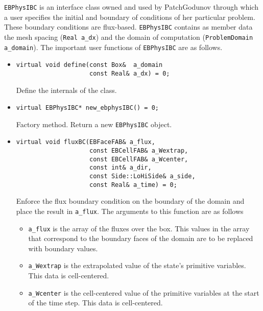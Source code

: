 {\tt EBPhysIBC} is an interface class owned and used by PatchGodunov
through which a user specifies the initial and boundary of conditions
of her particular problem.  These boundary conditions are 
flux-based.  {\tt EBPhysIBC} contains as member data the 
mesh spacing (\verb/Real a_dx/) and the domain of computation
(\verb/ProblemDomain a_domain/).
The important user functions of {\tt EBPhysIBC} are as follows.
\begin{itemize}
\item \begin{small}\begin{verbatim}
virtual void define(const Box&  a_domain
                    const Real& a_dx) = 0;
\end{verbatim}\end{small}
Define the internals of the class.

\item \begin{small}\begin{verbatim}
virtual EBPhysIBC* new_ebphysIBC() = 0;
\end{verbatim}\end{small}
Factory method.  Return a new {\tt EBPhysIBC} object.

\item \begin{small}\begin{verbatim}
virtual void fluxBC(EBFaceFAB& a_flux,
                    const EBCellFAB& a_Wextrap,
                    const EBCellFAB& a_Wcenter,
                    const int& a_dir,
                    const Side::LoHiSide& a_side,
                    const Real& a_time) = 0;
\end{verbatim}\end{small}
Enforce the flux boundary condition on the boundary of
the domain and place the result in {\verb/a_flux/}.
The arguments to this function are as follows
\begin{itemize}
\item \verb/a_flux/ is the array of the fluxes over
the box.  This values in the array that correspond to 
the boundary faces of the domain are to be replaced 
with boundary values.

\item \verb/a_Wextrap/  is the extrapolated value of the
        state's primitive variables.  This data is cell-centered.

\item \verb/a_Wcenter/  is the cell-centered value of the
        primitive variables at the start of the time step.
        This data is cell-centered.


\end{itemize}
\end{itemize}
